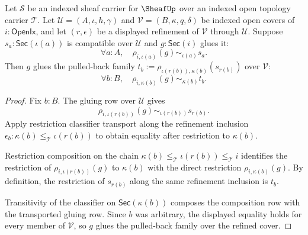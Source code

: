 \begin{theorem}
\label{thm:sheaf-refinement-gluing-descent}
Let $\mathcal{S}$ be an indexed sheaf carrier for $\SheafUp$ over an indexed open topology carrier $\mathcal{T}$. Let $\mathcal{U}=(A,\iota,h,\gamma)$ and $\mathcal{V}=(B,\kappa,q,\delta)$ be indexed open covers of $i:\mathsf{OpenIx}$, and let $(r,\epsilon)$ be a displayed refinement of $\mathcal{V}$ through $\mathcal{U}$. Suppose $s_a:\mathsf{Sec}(\iota(a))$ is compatible over $\mathcal{U}$ and $g:\mathsf{Sec}(i)$ glues it:
$$
\forall a:A,\quad \rho_{i,\iota(a)}(g)\sim_{\iota(a)}s_a.
$$
Then $g$ glues the pulled-back family $t_b:=\rho_{\iota(r(b)),\kappa(b)}(s_{r(b)})$ over $\mathcal{V}$:
$$
\forall b:B,\quad \rho_{i,\kappa(b)}(g)\sim_{\kappa(b)}t_b.
$$
\end{theorem}
\begin{proof}
Fix $b:B$. The gluing row over $\mathcal{U}$ gives
$$
\rho_{i,\iota(r(b))}(g)\sim_{\iota(r(b))}s_{r(b)}.
$$
Apply restriction classifier transport along the refinement inclusion $\epsilon_b:\kappa(b)\le_{\mathcal{T}}\iota(r(b))$ to obtain equality after restriction to $\kappa(b)$.

Restriction composition on the chain $\kappa(b)\le_{\mathcal{T}}\iota(r(b))\le_{\mathcal{T}}i$ identifies the restriction of $\rho_{i,\iota(r(b))}(g)$ to $\kappa(b)$ with the direct restriction $\rho_{i,\kappa(b)}(g)$. By definition, the restriction of $s_{r(b)}$ along the same refinement inclusion is $t_b$.

Transitivity of the classifier on $\mathsf{Sec}(\kappa(b))$ composes the composition row with the transported gluing row. Since $b$ was arbitrary, the displayed equality holds for every member of $\mathcal{V}$, so $g$ glues the pulled-back family over the refined cover.
\end{proof}

